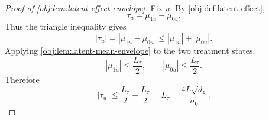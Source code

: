 \begin{proof}[Proof of \cref{obj:lem:latent-effect-envelope}]
Fix \(u\). By \cref{obj:def:latent-effect},
\[
\tau_u=\mu_{1u}-\mu_{0u}.
\]
Thus the triangle inequality gives
\[
|\tau_u|
=
|\mu_{1u}-\mu_{0u}|
\le
|\mu_{1u}|+|\mu_{0u}|.
\] %
Applying \cref{obj:lem:latent-mean-envelope} to the two treatment states,
\[
|\mu_{1u}|\le \frac{L_\tau}{2},
\qquad
|\mu_{0u}|\le \frac{L_\tau}{2}.
\] %
Therefore
\[
|\tau_u|
\le
\frac{L_\tau}{2}+\frac{L_\tau}{2}
=
L_\tau
=
\frac{4L\sqrt{d_z}}{\sigma_0}.
\] %
\end{proof}
